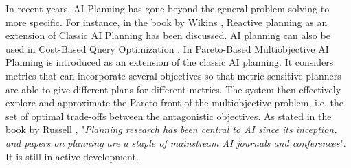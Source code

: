 \documentclass[11pt]{article}
\begin{document}
In recent years, AI Planning has gone beyond the general problem solving to more specific. For instance, in the book by Wikins \cite{wilkins2014practical}, Reactive planning as an extension of Classic AI Planning has been discussed. AI planning can also be used in Cost-Based Query Optimization \cite{robinson2014cost}.  In \cite{khouadjia2013pareto} Pareto-Based Multiobjective AI Planning is introduced as an extension of the classic AI planning. It considers metrics that can incorporate
several objectives so that metric sensitive planners  are able to give different plans for different metrics. The system then effectively explore and approximate the Pareto front of the multiobjective problem, i.e. the set of optimal trade-offs between the antagonistic objectives. As stated in the book by Russell \cite{russell1995modern}, "\emph{Planning research has been central to AI since its inception, and papers on planning are a staple of mainstream AI journals and conferences}". It is still in active development. 



\clearpage
\newpage

%

\end{document}
